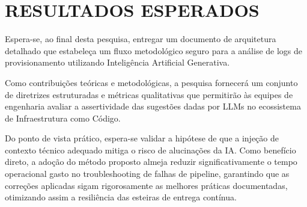 \section{RESULTADOS ESPERADOS}

Espera-se, ao final desta pesquisa, entregar um documento de arquitetura detalhado que estabeleça um fluxo metodológico seguro para a análise de logs de provisionamento utilizando Inteligência Artificial Generativa.

Como contribuições teóricas e metodológicas, a pesquisa fornecerá um conjunto de diretrizes estruturadas e métricas qualitativas que permitirão às equipes de engenharia avaliar a assertividade das sugestões dadas por LLMs no ecossistema de Infraestrutura como Código.

Do ponto de vista prático, espera-se validar a hipótese de que a injeção de contexto técnico adequado mitiga o risco de alucinações da IA. Como benefício direto, a adoção do método proposto almeja reduzir significativamente o tempo operacional gasto no troubleshooting de falhas de pipeline, garantindo que as correções aplicadas sigam rigorosamente as melhores práticas documentadas, otimizando assim a resiliência das esteiras de entrega contínua.
\newpage
